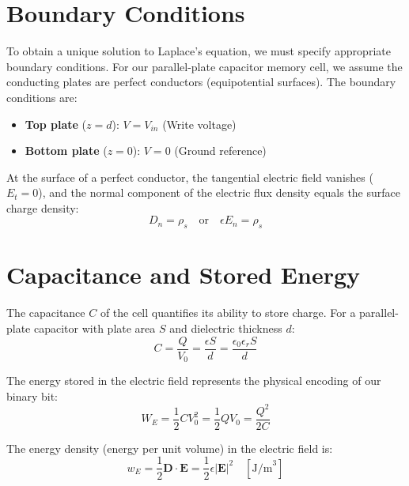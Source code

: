 \documentclass[12pt,a4paper]{report}
\begin{document}
\section{Boundary Conditions}

To obtain a unique solution to Laplace's equation, we must specify appropriate boundary conditions. For our parallel-plate capacitor memory cell, we assume the conducting plates are perfect conductors (equipotential surfaces). The boundary conditions are:

\begin{itemize}
    \item \textbf{Top plate} ($z = d$): $V = V_{in}$ (Write voltage)
    \item \textbf{Bottom plate} ($z = 0$): $V = 0$ (Ground reference)
\end{itemize}

At the surface of a perfect conductor, the tangential electric field vanishes ($E_t = 0$), and the normal component of the electric flux density equals the surface charge density:
\begin{equation}
    D_n = \rho_s \quad \text{or} \quad \epsilon E_n = \rho_s
    \label{eq:boundary_rho}
\end{equation}

\section{Capacitance and Stored Energy}

The capacitance $C$ of the cell quantifies its ability to store charge. For a parallel-plate capacitor with plate area $S$ and dielectric thickness $d$:
\begin{equation}
    C = \frac{Q}{V_0} = \frac{\epsilon S}{d} = \frac{\epsilon_0 \epsilon_r S}{d}
    \label{eq:capacitance}
\end{equation}

The energy stored in the electric field represents the physical encoding of our binary bit:
\begin{equation}
    W_E = \frac{1}{2} C V_0^2 = \frac{1}{2} Q V_0 = \frac{Q^2}{2C}
    \label{eq:energy}
\end{equation}

The energy density (energy per unit volume) in the electric field is:
\begin{equation}
    w_E = \frac{1}{2} \mathbf{D} \cdot \mathbf{E} = \frac{1}{2} \epsilon |\mathbf{E}|^2 \quad [\text{J/m}^3]
    \label{eq:energy_density}
\end{equation}
\end{document}
